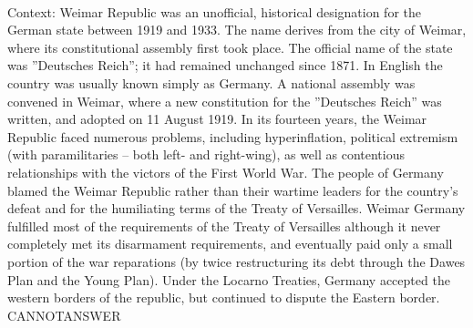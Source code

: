\documentclass[11pt,a4paper, onecolumn]{article}
\begin{document}
\\ Context: Weimar Republic was an unofficial, historical designation for the German state between 1919 and 1933. The name derives from the city of Weimar, where its constitutional assembly first took place. The official name of the state was ''Deutsches Reich''; it had remained unchanged since 1871. In English the country was usually known simply as Germany. A national assembly was convened in Weimar, where a new constitution for the ''Deutsches Reich'' was written, and adopted on 11 August 1919. In its fourteen years, the Weimar Republic faced numerous problems, including hyperinflation, political extremism (with paramilitaries – both left- and right-wing), as well as contentious relationships with the victors of the First World War. The people of Germany blamed the Weimar Republic rather than their wartime leaders for the country's defeat and for the humiliating terms of the Treaty of Versailles. Weimar Germany fulfilled most of the requirements of the Treaty of Versailles although it never completely met its disarmament requirements, and eventually paid only a small portion of the war reparations (by twice restructuring its debt through the Dawes Plan and the Young Plan). Under the Locarno Treaties, Germany accepted the western borders of the republic, but continued to dispute the Eastern border. CANNOTANSWER
\end{document}
